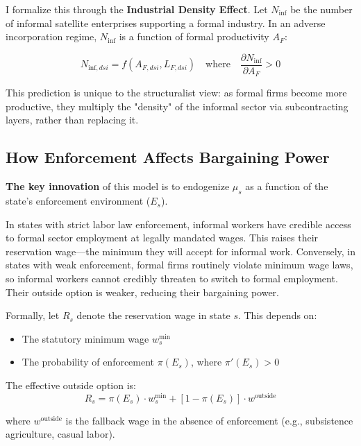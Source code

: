 I formalize this through the \textbf{Industrial Density Effect}. Let $N_{\text{inf}}$ be the number of informal satellite enterprises supporting a formal industry. In an adverse incorporation regime, $N_{\text{inf}}$ is a function of formal productivity $A_F$:

\begin{equation}
	N_{\text{inf},dsi} = f(A_{F,dsi}, L_{F,dsi}) \quad \text{where} \quad \frac{\partial N_{\text{inf}}}{\partial A_F} > 0
\end{equation}

This prediction is unique to the structuralist view: as formal firms become more productive, they multiply the "density" of the informal sector via subcontracting layers, rather than replacing it.

\subsection{How Enforcement Affects Bargaining Power}

\textbf{The key innovation} of this model is to endogenize $\mu_s$ as a function of the state's enforcement environment ($E_s$).

In states with strict labor law enforcement, informal workers have credible access to formal sector employment at legally mandated wages. This raises their reservation wage---the minimum they will accept for informal work. Conversely, in states with weak enforcement, formal firms routinely violate minimum wage laws, so informal workers cannot credibly threaten to switch to formal employment. Their outside option is weaker, reducing their bargaining power.

Formally, let $R_s$ denote the reservation wage in state $s$. This depends on:
\begin{itemize}
	\item The statutory minimum wage $w^{\text{min}}_s$
	\item The probability of enforcement $\pi(E_s)$, where $\pi'(E_s) > 0$
\end{itemize}

The effective outside option is:
\begin{equation}
	R_s = \pi(E_s) \cdot w^{\text{min}}_s + [1 - \pi(E_s)] \cdot w^{\text{outside}}
\end{equation}

where $w^{\text{outside}}$ is the fallback wage in the absence of enforcement (e.g., subsistence agriculture, casual labor).

